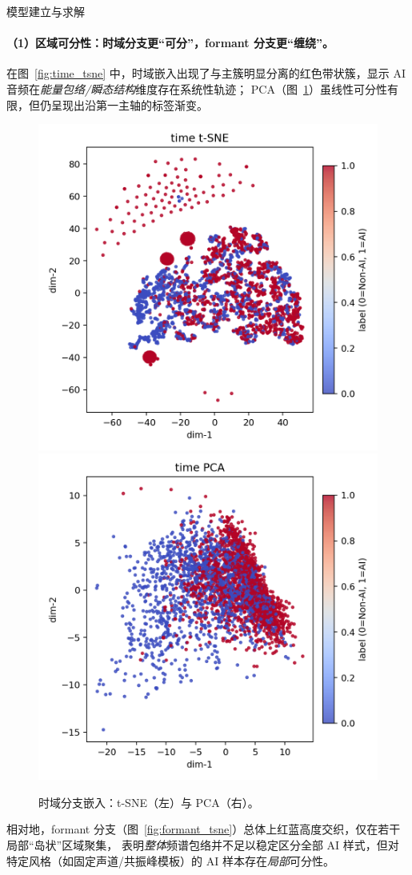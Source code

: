 \documentclass[aspectratio=169]{beamer}
\begin{document}
\begin{frame}{模型建立与求解}
\paragraph{（1）区域可分性：时域分支更“可分”，formant 分支更“缠绕”。}
在图~\ref{fig:time_tsne} 中，时域嵌入出现了与主簇明显分离的红色带状簇，显示 AI 音频在\emph{能量包络/瞬态结构}维度存在系统性轨迹；
PCA（图~\ref{fig:time_pca}）虽线性可分性有限，但仍呈现出沿第一主轴的标签渐变。

\begin{figure}[H]
  \centering
  \includegraphics[width=.4\linewidth]{images_in_paper/embed_time_tsne.png}
  \includegraphics[width=.4\linewidth]{images_in_paper/embed_time_pca.png}
  \caption{时域分支嵌入：t-SNE（左）与 PCA（右）。}
  \label{fig:time_tsne}
  \label{fig:time_pca}
\end{figure}

相对地，formant 分支（图~\ref{fig:formant_tsne}）总体上红蓝高度交织，仅在若干局部“岛状”区域聚集，
表明\emph{整体}频谱包络并不足以稳定区分全部 AI 样式，但对特定风格（如固定声道/共振峰模板）的 AI 样本存在\emph{局部}可分性。


\end{frame}
\end{document}
